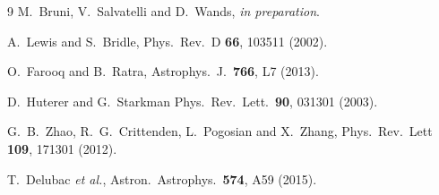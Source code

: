 \documentclass[prd,twocolumn,preprintnumbers,amsmath,amssymb,nofootinbib,english,showpacs]{revtex4-1}
\begin{document}
\begin{thebibliography}{9}
M.~Bruni, V.~Salvatelli and D.~Wands, {\em in preparation}.

  A.~Lewis and S.~Bridle,
  Phys.\ Rev.\ D {\bf 66}, 103511 (2002).

  O.~Farooq and B.~Ratra,
  Astrophys.\ J.\  {\bf 766}, L7 (2013).

  D.~Huterer and G.~Starkman
  Phys.\ Rev.\ Lett.\ {\bf 90}, 031301 (2003).

 G.~B.~Zhao, R.~G.~Crittenden, L.~Pogosian and X.~Zhang,
  Phys.\ Rev.\ Lett {\bf 109}, 171301 (2012).

  T.~Delubac {\it et al.}, %
  Astron.\ Astrophys.\  {\bf 574}, A59 (2015).

\end{thebibliography}
\end{document}
